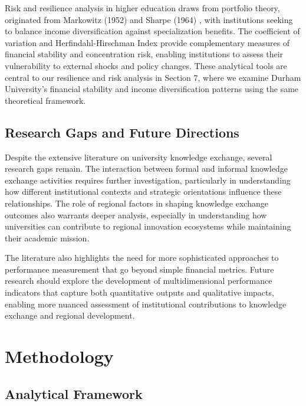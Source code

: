 \documentclass[journal,onecolumn, 10pt,draftclsnofoot]{IEEEtran}
\begin{document}
Risk and resilience analysis in higher education draws from portfolio theory, originated from Markowitz (1952) \cite{markowitz1952portfolio} and Sharpe (1964) \cite{sharpe1964capital}, with institutions seeking to balance income diversification against specialization benefits. The coefficient of variation and Herfindahl-Hirschman Index provide complementary measures of financial stability and concentration risk, enabling institutions to assess their vulnerability to external shocks and policy changes. These analytical tools are central to our resilience and risk analysis in Section 7, where we examine Durham University's financial stability and income diversification patterns using the same theoretical framework.

\subsection{Research Gaps and Future Directions}

Despite the extensive literature on university knowledge exchange, several research gaps remain. The interaction between formal and informal knowledge exchange activities requires further investigation, particularly in understanding how different institutional contexts and strategic orientations influence these relationships. The role of regional factors in shaping knowledge exchange outcomes also warrants deeper analysis, especially in understanding how universities can contribute to regional innovation ecosystems while maintaining their academic mission.

The literature also highlights the need for more sophisticated approaches to performance measurement that go beyond simple financial metrics. Future research should explore the development of multidimensional performance indicators that capture both quantitative outputs and qualitative impacts, enabling more nuanced assessment of institutional contributions to knowledge exchange and regional development.

\section{Methodology}

\subsection{Analytical Framework}
\end{document}

